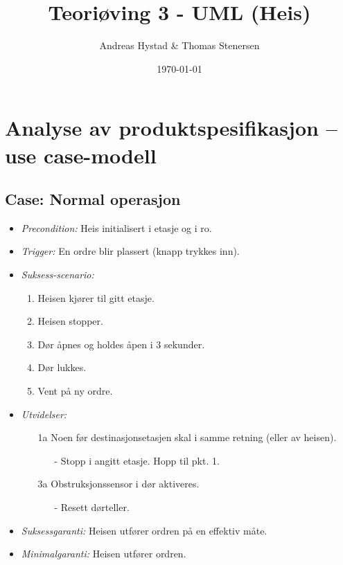 \documentclass[a4paper, norsk, titlepage]{scrartcl}
\begin{document}
\title{Teoriøving 3 - UML (Heis)}
\author{Andreas Hystad \& Thomas Stenersen}
\date{\today}
\maketitle

\section*{Analyse av produktspesifikasjon -- use case-modell}
\subsection*{Case: Normal operasjon}
\begin{itemize}
\item \emph{Precondition:} Heis initialisert i etasje og i ro.
\item \emph{Trigger:} En ordre blir plassert (knapp trykkes inn).
\item \emph{Suksess-scenario:}
\begin{enumerate}
\item Heisen kjører til gitt etasje.
\item Heisen stopper.
\item Dør åpnes og holdes åpen i 3 sekunder.
\item Dør lukkes.
\item Vent på ny ordre.
\end{enumerate}

\item \emph{Utvidelser:}
\begin{itemize}
\item [1a] Noen før destinasjonsetasjen skal i samme retning (eller av heisen).
\begin{itemize}
\item[-] Stopp i angitt etasje. Hopp til pkt. 1.
\end{itemize}

\item [3a] Obstruksjonssensor i dør aktiveres.
\begin{itemize}
\item[-] Resett dørteller.
\end{itemize}
\end{itemize}

\item \emph{Suksessgaranti:} Heisen utfører ordren på en effektiv måte.%
\item \emph{Minimalgaranti:} Heisen utfører ordren.

\end{itemize}
\end{document}
